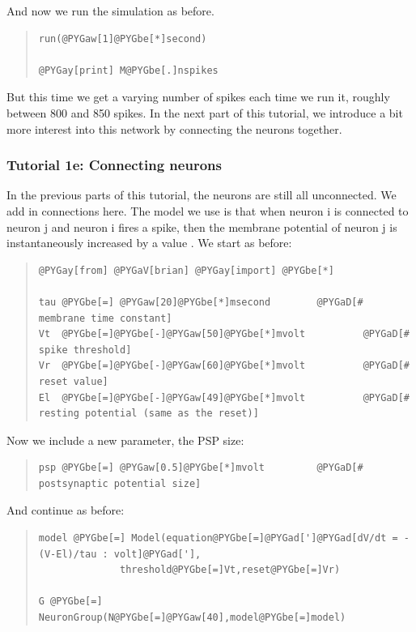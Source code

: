 \documentclass[letterpaper,10pt]{manual}
\begin{document}
And now we run the simulation as before.
\begin{quote}

\begin{Verbatim}[commandchars=@\[\]]
run(@PYGaw[1]@PYGbe[*]second)

@PYGay[print] M@PYGbe[.]nspikes
\end{Verbatim}
\end{quote}

But this time we get a varying number of spikes each time
we run it, roughly between 800 and 850 spikes. In the
next part of this tutorial, we introduce a bit more
interest into this network by connecting the neurons together.

\resetcurrentobjects


\subsubsection{Tutorial 1e: Connecting neurons}

In the previous parts of this tutorial, the neurons are
still all unconnected. We add in connections here. The
model we use is that when neuron i is connected to
neuron j and neuron i fires a spike, then the membrane
potential of neuron j is instantaneously increased by
a value . We start as before:
\begin{quote}

\begin{Verbatim}[commandchars=@\[\]]
@PYGay[from] @PYGaV[brian] @PYGay[import] @PYGbe[*]

tau @PYGbe[=] @PYGaw[20]@PYGbe[*]msecond        @PYGaD[# membrane time constant]
Vt  @PYGbe[=]@PYGbe[-]@PYGaw[50]@PYGbe[*]mvolt          @PYGaD[# spike threshold]
Vr  @PYGbe[=]@PYGbe[-]@PYGaw[60]@PYGbe[*]mvolt          @PYGaD[# reset value]
El  @PYGbe[=]@PYGbe[-]@PYGaw[49]@PYGbe[*]mvolt          @PYGaD[# resting potential (same as the reset)]
\end{Verbatim}
\end{quote}

Now we include a new parameter, the PSP size:
\begin{quote}

\begin{Verbatim}[commandchars=@\[\]]
psp @PYGbe[=] @PYGaw[0.5]@PYGbe[*]mvolt         @PYGaD[# postsynaptic potential size]
\end{Verbatim}
\end{quote}

And continue as before:
\begin{quote}

\begin{Verbatim}[commandchars=@\[\]]
model @PYGbe[=] Model(equation@PYGbe[=]@PYGad[']@PYGad[dV/dt = -(V-El)/tau : volt]@PYGad['],
              threshold@PYGbe[=]Vt,reset@PYGbe[=]Vr)

G @PYGbe[=] NeuronGroup(N@PYGbe[=]@PYGaw[40],model@PYGbe[=]model)
\end{Verbatim}
\end{quote}
\end{document}
